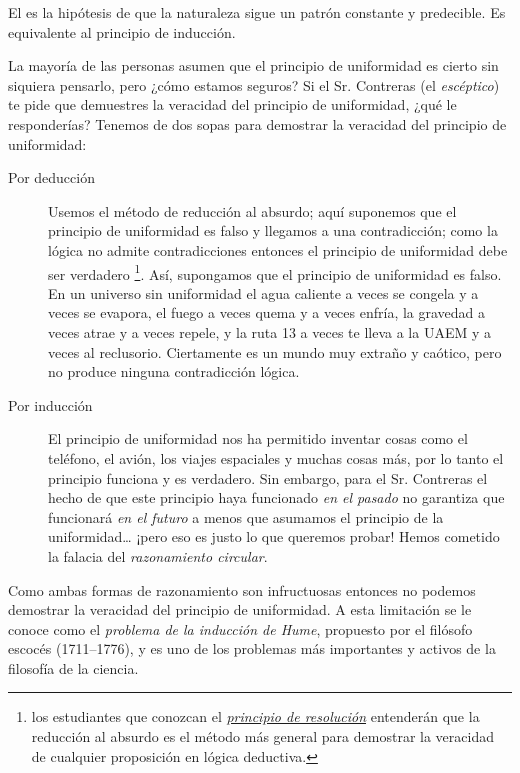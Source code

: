 \begin{remember}
    \label{rem:principio de uniformidad}
    El  es la hipótesis de que la
    naturaleza sigue un patrón constante y predecible.
    Es equivalente al principio de inducción.
\end{remember}

La mayoría de las personas asumen que el principio de uniformidad es cierto
sin siquiera pensarlo, pero ¿cómo estamos seguros?
Si el Sr. Contreras (el \emph{escéptico}) te pide que demuestres la veracidad
del principio de uniformidad, ¿qué le responderías?
Tenemos de dos sopas para demostrar la veracidad del principio de uniformidad:
\begin{description}
    \item[Por deducción] Usemos el método de reducción al absurdo; aquí
        suponemos que el principio de uniformidad es falso y llegamos a una
        contradicción; como la lógica no admite contradicciones entonces el
        principio de uniformidad debe ser verdadero%
        \footnote{%
            los estudiantes que conozcan el
            \href{http://intrologic.stanford.edu/extras/resolution.html}%
            {\emph{principio de resolución}} entenderán que la reducción al
            absurdo es el método más general para demostrar la veracidad de
            cualquier proposición en lógica deductiva.
        }.
        Así, supongamos que el principio de uniformidad es falso.
        En un universo sin uniformidad el agua caliente a veces se congela y a
        veces se evapora, el fuego a veces quema y a veces enfría, la gravedad
        a veces atrae y a veces repele, y la ruta 13 a veces te lleva a la UAEM
        y a veces al reclusorio.
        Ciertamente es un mundo muy extraño y caótico, pero no produce ninguna
        contradicción lógica.
    \item[Por inducción] El principio de uniformidad nos ha permitido inventar
        cosas como el teléfono, el avión, los viajes espaciales y muchas cosas
        más, por lo tanto el principio funciona y es verdadero.
        Sin embargo, para el Sr. Contreras el hecho de que este principio haya
        funcionado \emph{en el pasado} no garantiza que funcionará \emph{en el
            futuro} a menos que asumamos el principio de la uniformidad… ¡pero
        eso es justo lo que queremos probar! Hemos cometido la falacia del
        \emph{razonamiento circular}.
\end{description}
Como ambas formas de razonamiento son infructuosas entonces no podemos demostrar
la veracidad del principio de uniformidad.
A esta limitación se le conoce como el \emph{problema de la inducción de Hume},
propuesto por el filósofo escocés  (1711--1776),
y es uno de los problemas más importantes y activos de la filosofía de la
ciencia.

